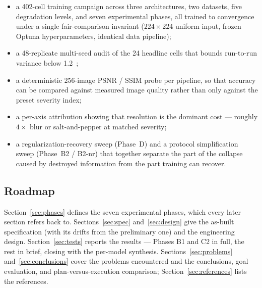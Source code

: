 \begin{itemize}
  \item a 402-cell training campaign across three architectures, two
        datasets, five degradation levels, and seven experimental phases, all
        trained to convergence under a single fair-comparison invariant
        ($224 \times 224$ uniform input, frozen Optuna hyperparameters,
        identical data pipeline);
  \item a 48-replicate multi-seed audit of the 24 headline cells that bounds
        run-to-run variance below 1.2~\Mpp{};
  \item a deterministic 256-image PSNR / SSIM probe per pipeline, so that
        accuracy can be compared against measured image quality rather than
        only against the preset severity index;
  \item a per-axis attribution showing that resolution is the dominant cost
        --- roughly $4\times$ blur or salt-and-pepper at matched severity;
  \item a regularization-recovery sweep (Phase~D) and a protocol
        simplification sweep (Phase~B2 / B2-nr) that together separate the
        part of the collapse caused by destroyed information from the part
        training can recover.
\end{itemize}

\subsection{Roadmap}
Section~\ref{sec:phases} defines the seven experimental phases, which every
later section refers back to. Sections~\ref{sec:spec} and~\ref{sec:design}
give the as-built specification (with its drifts from the preliminary one)
and the engineering design. Section~\ref{sec:tests} reports the results ---
Phases B1 and C2 in full, the rest in brief, closing with the per-model
synthesis. Sections~\ref{sec:problems} and~\ref{sec:conclusions} cover the
problems encountered and the conclusions, goal evaluation, and
plan-versus-execution comparison; Section~\ref{sec:references} lists the
references.
